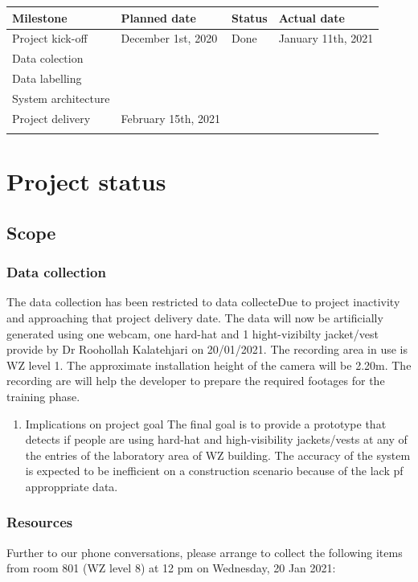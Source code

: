 \documentclass{article}
\begin{document}
\begin{center}
\begin{tabular}{llll}
Milestone & Planned date & Status & Actual date\\
\hline
Project kick-off & December 1st, 2020 & Done & January 11th, 2021\\
Data colection &  &  & \\
Data labelling &  &  & \\
System architecture &  &  & \\
Project delivery & February 15th, 2021 &  & \\
 &  &  & \\
\end{tabular}
\end{center}

\section{Project status}
\label{sec:org9fe9779}

\subsection{Scope}
\label{sec:org1042619}

\subsubsection{Data collection}
\label{sec:orgac9c09f}
The data collection has been restricted to data collecteDue to project inactivity and approaching that project delivery date.
The data will now be artificially generated using one webcam, one hard-hat and 1 hight-vizibilty jacket/vest provide by Dr Roohollah Kalatehjari on 20/01/2021.
The recording area in use is WZ level 1.
The approximate installation height of the camera will be 2.20m. 
The recording are will help the developer to prepare the required footages for the training phase. 
\begin{enumerate}
\item Implications on project goal
\label{sec:orged22d82}
The final goal is to provide a prototype that detects if people are using hard-hat and high-visibility jackets/vests at any of the entries of the laboratory area of WZ building.
The accuracy of the system is expected to be inefficient on a construction scenario because of the lack pf approppriate data.
\end{enumerate}


\subsubsection{Resources}
\label{sec:orga344190}
Further to our phone conversations, please arrange to collect the following items from room 801 (WZ level 8) at 12 pm on Wednesday, 20 Jan 2021:
\end{document}
